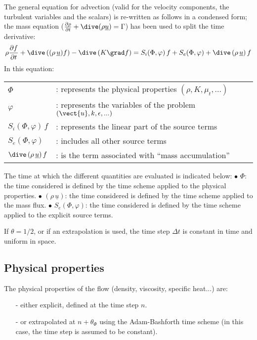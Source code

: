The general equation for advection (valid for the velocity components, the
turbulent variables and the scalars) is re-written as follows in a condensed
form; the mass equation ($\frac{\partial \rho } {\partial t}+ \dive(\rho
\underline{u}) = \Gamma$) has been used to split the time derivative:
\begin{equation}  \label{Base_Introd_simple}
\rho \frac {\partial f}{\partial t} + \dive\,((\rho\,\underline{u}) f) - %
\dive\,(K \grad f) = S_{i}(\Phi,\varphi)\,f + S_{e}(\Phi,\varphi) + \dive%
\,(\rho\,\underline{u})\,f
\end{equation}
In this equation:\newline
\begin{tabular}{ll}
$\Phi$ & : represents the physical properties $(\rho,K,\mu_{t},...)$ \\
$\varphi$ & : represents the variables of the problem $(\vect{u}%
,k,\epsilon,...)$ \\
$S_{i}(\Phi,\varphi)\,f$ & : represents the linear part of the source terms
\\
$S_{e}(\Phi,\varphi)$ & : includes all other source terms \\
$\dive\,(\rho\,\underline{u})\,f$ & : is the term associated with ``mass
accumulation''%
\end{tabular}
\newline
\newline

The time at which the different quantities are evaluated is indicated below:%
\newline
$\bullet$ $\Phi$: the time considered is defined by the time scheme applied
to the physical properties.\newline
$\bullet$ $(\rho\,\underline{u})$: the time considered is defined by the
time scheme applied to the mass flux.\newline
$\bullet$ $S_{e}(\Phi,\varphi)$: the time considered is defined by the time
scheme applied to the explicit source terms.

If $\theta=1/2$, or if an extrapolation is used, the time step $\Delta t$ is
constant in time and uniform in space.

\subsection*{Physical properties}

The physical properties of the flow (density, viscosity, specific heat...)
are:

\begin{itemize}
\item[-] either explicit, defined at the time step $n$.

\item[-] or extrapolated at $n+\theta _{\Phi }$ using the Adam-Bashforth
time scheme (in this case, the time step is assumed to be constant).
\end{itemize}

